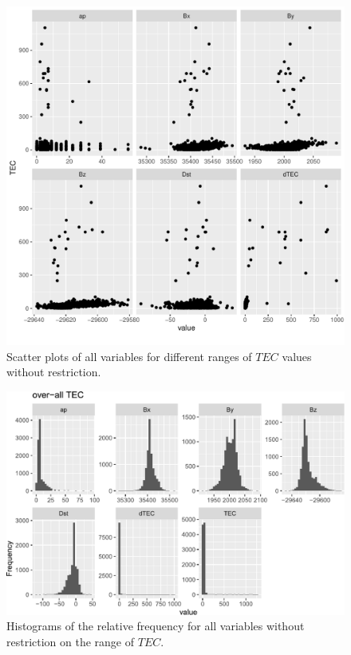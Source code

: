 \documentclass[sn-mathphys-num]{sn-jnl}%
\begin{document}
\begin{figure}
    \centering
    \includegraphics[width=0.9\linewidth]{dataset2scatterplot.pdf}
    \caption{Scatter plots of all variables for different ranges of $TEC$ values without restriction.}
    \label{fig:dataset2scatterplot}
\end{figure}

\begin{figure}
    \centering
    \includegraphics[width=0.9\linewidth]{allTEC_fix.pdf}
    \caption{Histograms of the relative frequency for all variables without restriction on the range of $TEC$.}
    \label{fig:allTEC}
\end{figure}
\end{document}
